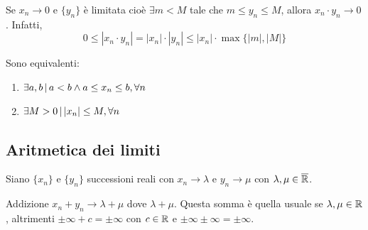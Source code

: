 \documentclass[a4paper]{article}
\begin{document}
\begin{snippetproposition}{}
    Se \(x_n \to 0\) e \(\{y_n\}\) è limitata cioè \(\exists m < M\)
    tale che \(m \leq y_n \leq M\), allora \(x_n \cdot y_n \to 0\).
    Infatti,
    \[
        0 \leq |x_n \cdot y_n| = |x_n|\cdot |y_n| \leq |x_n| \cdot \max\{ |m|, |M| \}
    \]
\end{snippetproposition}
\begin{snippetproposition}{}
    Sono equivalenti:
    \begin{enumerate}
        \item \(\exists a,b \,|\, a < b \land a \leq x_n \leq b, \forall n\)
        \item \(\exists M > 0 \,|\, |x_n| \leq M, \forall n\)
    \end{enumerate}
\end{snippetproposition}

\pagebreak

\subsection{Aritmetica dei limiti}

Siano \(\{x_n\}\) e \(\{y_n\}\) successioni reali con \(x_n \to \lambda\)
e \(y_n \to \mu\) con \(\lambda, \mu \in \overline{\mathbb{R}}\).

\begin{snippetproposition}{Addizione}
    \(x_n + y_n \to \lambda + \mu\) dove \(\lambda + \mu\).
    Questa somma è quella usuale se \(\lambda, \mu \in \mathbb{R}\), altrimenti \(\pm\infty + c = \pm\infty\)
    con \(c\in\mathbb{R}\) e \(\pm\infty \pm \infty = \pm\infty\).
\end{snippetproposition}
\end{document}
